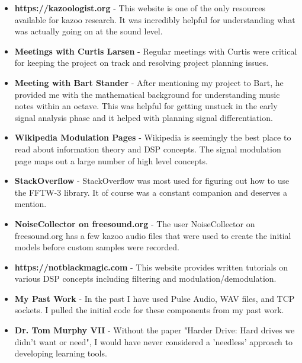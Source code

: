 \documentclass[]{article}
\begin{document}
\begin{itemize}
  \item \textbf{https://kazoologist.org} - This website is one of the only resources available for kazoo research. It was incredibly helpful for understanding what was actually going on at the sound level.

  \item \textbf{Meetings with Curtis Larsen} - Regular meetings with Curtis were critical for keeping the project on track and resolving project planning issues.

  \item \textbf{Meeting with Bart Stander} - After mentioning my project to Bart, he provided me with the mathematical background for understanding music notes within an octave. This was helpful for getting unstuck in the early signal analysis phase and it helped with planning signal differentiation.

  \item \textbf{Wikipedia Modulation Pages} - Wikipedia is seemingly the best place to read about information theory and DSP concepts. The signal modulation page maps out a large number of high level concepts.

  \item \textbf{StackOverflow} - StackOverflow was most used for figuring out how to use the FFTW-3 library. It of course was a constant companion and deserves a mention.

  \item \textbf{NoiseCollector on freesound.org} - The user NoiseCollector on freesound.org has a few kazoo audio files that were used to create the initial models before custom samples were recorded.

  \item \textbf{https://notblackmagic.com} - This website provides written tutorials on various DSP concepts including filtering and modulation/demodulation.

  \item \textbf{My Past Work} - In the past I have used Pulse Audio, WAV files, and TCP sockets. I pulled the initial code for these components from my past work.
  
  \item \textbf{Dr. Tom Murphy VII} - Without the paper "Harder Drive: Hard drives we didn't want or need", I would have never considered a 'needless' approach to developing learning tools.

\end{itemize}
\end{document}
